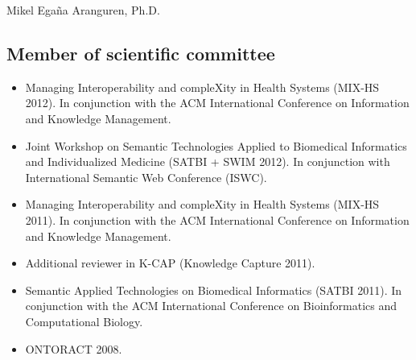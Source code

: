 \documentclass[english,11pt,a4paper,oneside]{article}
\begin{document}
\begin{cv}{Mikel Ega\~na Aranguren, Ph.D. }
\subsection*{Member of scientific committee}
\begin{itemize}
	\item Managing Interoperability and compleXity in Health Systems (MIX-HS 2012). In conjunction with the ACM International Conference on Information and Knowledge Management. %
	\item Joint Workshop on Semantic Technologies Applied to Biomedical Informatics and Individualized Medicine (SATBI + SWIM 2012). In conjunction with International Semantic Web Conference (ISWC). %
	\item Managing Interoperability and compleXity in Health Systems (MIX-HS 2011). In conjunction with the ACM International Conference on Information and Knowledge Management. %
	\item Additional reviewer in K-CAP (Knowledge Capture 2011). %
	\item Semantic Applied Technologies on Biomedical Informatics (SATBI 2011). In conjunction with the ACM International Conference on Bioinformatics and Computational Biology.  %
	\item ONTORACT 2008.
\end{itemize}


\end{cv}
\end{document}
